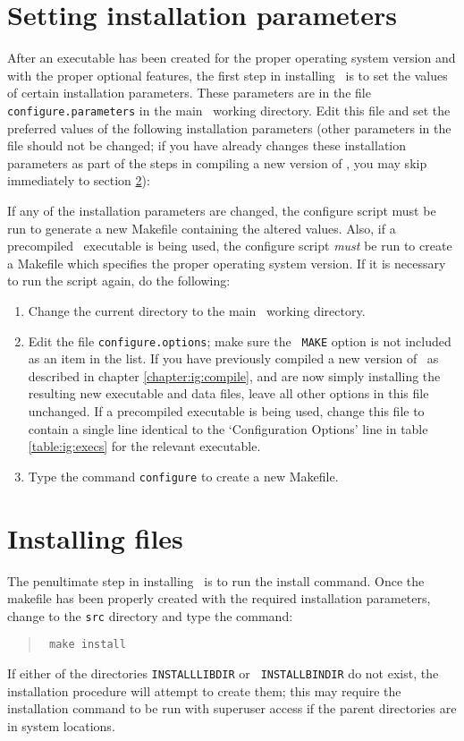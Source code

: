 \section{Setting installation parameters}
\label{section:ig:instparams}

After an executable has been created for the proper operating system
version and with the proper optional features, the first step in
installing \VMD\ is to set the values of certain installation
parameters.  These parameters are in the file {\tt
configure.parameters} in the main \VMD\ working directory.  Edit this
file and set the preferred values of the following installation
parameters (other parameters in the file should not be changed; if you
have already changes these installation parameters as part of the
steps in compiling a new version of \VMD, you may skip immediately to
section
\ref{section:ig:installfile}):


If any of the installation parameters are changed, the configure
script must be run to generate a new Makefile containing the altered
values.  Also, if a precompiled \VMD\ executable is being used, the
configure script {\em must} be run to create a Makefile which
specifies the proper operating system version. If it is necessary to
run the script again, do the following:
\begin{enumerate}
  \item Change the current directory to the main \VMD\ working
directory.
  \item Edit the file {\tt configure.options}; make sure the {\tt
MAKE} option is not included as an item in the list.  If you have
previously compiled a new version of \VMD\ as described in chapter
\ref{chapter:ig:compile}, and are now simply installing the resulting
new executable and data files, leave all other options in this file
unchanged.  If a precompiled executable is being used, change this
file to contain a single line identical to the `Configuration Options'
line in table \ref{table:ig:execs} for the relevant executable. 
  \item Type the command {\tt configure} to create a new Makefile.
\end{enumerate}

\section{Installing files}
\label{section:ig:installfile}

The penultimate step in installing \VMD\ is to run the install command. 
Once the makefile has been properly created with the required
installation parameters, change to the {\tt src} directory and type
the command:
\begin{quote} {\tt
  make install
} \end{quote}
If either of the directories {\tt INSTALLLIBDIR} or {\tt
INSTALLBINDIR} do not exist, the installation procedure will
attempt to create them; this may require the installation command to
be run with superuser access if the parent directories are in system
locations.

